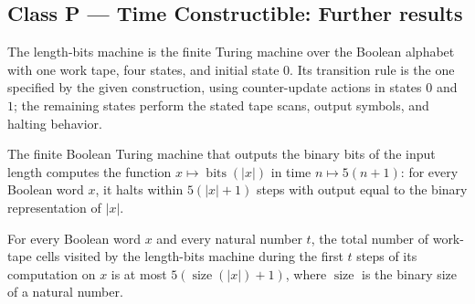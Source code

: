 \subsection*{Class P --- Time Constructible: Further results}

\begin{definition}
\label{Turing.FinTM.lengthBitsTM}
\leanok
{}
The length-bits machine is the finite Turing machine over the Boolean alphabet with one
work tape, four states, and initial state $0$. Its transition rule is the one specified
by the given construction, using counter-update actions in states $0$ and $1$; the
remaining states perform the stated tape scans, output symbols, and halting behavior.
\end{definition}

\begin{theorem}
\label{Turing.FinTM.lengthBitsTM_computes}
\leanok
{}
The finite Boolean Turing machine that outputs the binary bits of the input length
computes the function $x\mapsto \operatorname{bits}(|x|)$ in time $n\mapsto 5(n+1)$: for
every Boolean word $x$, it halts within $5(|x|+1)$ steps with output equal to the binary
representation of $|x|$.
\end{theorem}

\begin{theorem}
\label{Turing.FinTM.lengthBitsTM_spaceUsed}
\leanok
{}
For every Boolean word $x$ and every natural number $t$, the total number of work-tape
cells visited by the length-bits machine during the first $t$ steps of its computation
on $x$ is at most $5(\operatorname{size}(|x|)+1)$, where $\operatorname{size}$ is the
binary size of a natural number.
\end{theorem}
